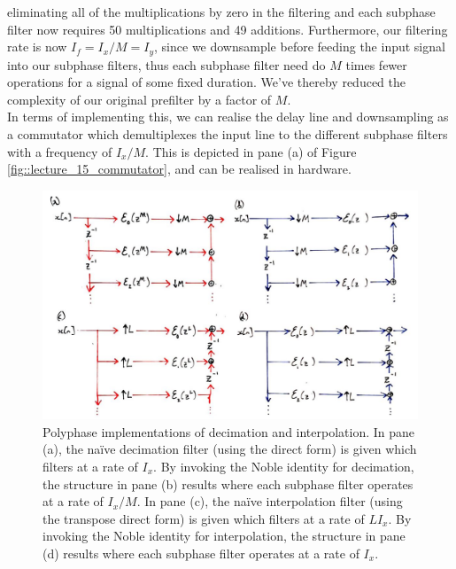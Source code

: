 eliminating all of the multiplications by zero in the filtering and each subphase
filter now requires 50 multiplications and 49 additions. Furthermore,
our filtering rate is now $I_f = I_x / M = I_y$, since we downsample before feeding
the input signal into our subphase filters, thus each subphase filter need do $M$
times fewer operations for a signal of some fixed duration. We've thereby reduced
the complexity of our original prefilter by a factor of $M$.\\
%
In terms of implementing this, we can realise the delay line and downsampling as a
commutator which demultiplexes the input line to the different subphase filters with a
frequency of $I_x / M$. This is depicted in pane (a) of Figure
\ref{fig::lecture_15_commutator}, and can be realised in hardware.
%
\begin{figure}[H]
  \includegraphics[width=\textwidth]{images/lecture_15_polyphase.JPG}
  \caption{Polyphase implementations of decimation and interpolation. In pane (a),
    the na\"{i}ve decimation filter (using the direct form) is given which filters at a
    rate of $I_x$. By
    invoking the Noble identity for decimation, the structure in pane (b) results
    where each subphase filter operates at a rate of $I_x/M$. In pane (c),
    the na\"{i}ve interpolation filter (using the transpose direct form) is given
    which filters at a rate of $LI_x$. By
    invoking the Noble identity for interpolation, the structure in pane (d) results
    where each subphase filter operates at a rate of $I_x$.
  }
  \label{fig::lecture_15_polyphase}
\end{figure}

